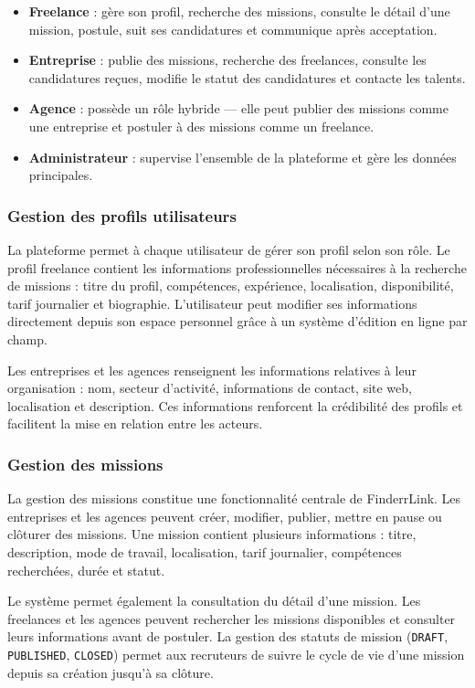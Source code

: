 \begin{itemize}
    \item \textbf{Freelance} : gère son profil, recherche des missions, consulte le détail d'une mission, postule, suit ses candidatures et communique après acceptation.
    \item \textbf{Entreprise} : publie des missions, recherche des freelances, consulte les candidatures reçues, modifie le statut des candidatures et contacte les talents.
    \item \textbf{Agence} : possède un rôle hybride — elle peut publier des missions comme une entreprise et postuler à des missions comme un freelance.
    \item \textbf{Administrateur} : supervise l'ensemble de la plateforme et gère les données principales.
\end{itemize}

\subsubsection{Gestion des profils utilisateurs}

La plateforme permet à chaque utilisateur de gérer son profil selon son rôle. Le profil freelance contient les informations professionnelles nécessaires à la recherche de missions : titre du profil, compétences, expérience, localisation, disponibilité, tarif journalier et biographie. L'utilisateur peut modifier ses informations directement depuis son espace personnel grâce à un système d'édition en ligne par champ.

Les entreprises et les agences renseignent les informations relatives à leur organisation : nom, secteur d'activité, informations de contact, site web, localisation et description. Ces informations renforcent la crédibilité des profils et facilitent la mise en relation entre les acteurs.

\subsubsection{Gestion des missions}

La gestion des missions constitue une fonctionnalité centrale de FinderrLink. Les entreprises et les agences peuvent créer, modifier, publier, mettre en pause ou clôturer des missions. Une mission contient plusieurs informations : titre, description, mode de travail, localisation, tarif journalier, compétences recherchées, durée et statut.

Le système permet également la consultation du détail d'une mission. Les freelances et les agences peuvent rechercher les missions disponibles et consulter leurs informations avant de postuler. La gestion des statuts de mission (\texttt{DRAFT}, \texttt{PUBLISHED}, \texttt{CLOSED}) permet aux recruteurs de suivre le cycle de vie d'une mission depuis sa création jusqu'à sa clôture.

